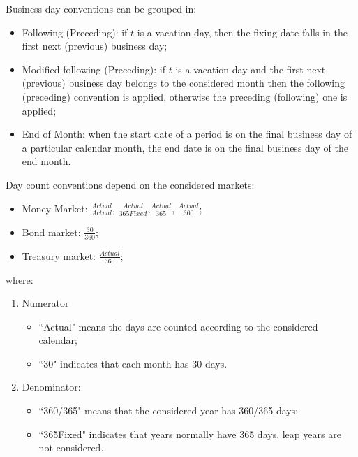 Business day conventions can be grouped in:

\begin{itemize}
\item Following (Preceding): if $t$ is a vacation day, then the fixing date falls in the first next (previous) business day; 
\item Modified following (Preceding): if $t$ is a vacation day and the first next (previous) business day belongs to the considered month then the following (preceding) convention is applied, otherwise the preceding (following) one is applied;
\item End of Month: when the start date of a period is on the final business day of a particular
calendar month, the end date is on the final business day of the end month.
\end{itemize}


Day count conventions depend on the considered markets:

\begin{itemize}
    \item Money Market: $\frac{Actual}{Actual}$, $\frac{Actual}{365Fixed}$,$\frac{Actual}{365}$, $\frac{Actual}{360}$; 
    \item Bond market: $\frac{30}{360}$;
    \item Treasury market: $\frac{Actual}{360}$;
\end{itemize}

where:

\begin{enumerate}
    \item Numerator
    
    \begin{itemize}
    \item ``Actual" means the days are counted according to the considered calendar;
    \item ``30" indicates that each month has 30 days.
    \end{itemize}
    
    \item Denominator:
    
    \begin{itemize}
    \item ``360/365" means that the considered year has 360/365 days;
    \item ``365Fixed" indicates that years normally have 365 days, leap years are not considered.
    \end{itemize}
    
\end{enumerate}


